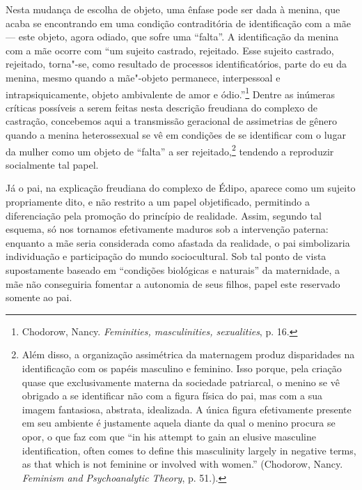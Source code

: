 Nesta mudança de escolha de objeto, uma ênfase pode ser dada à menina,
que acaba se encontrando em uma condição contraditória de identificação
com a mãe --- este objeto, agora odiado, que sofre uma ``falta''. A
identificação da menina com a mãe ocorre com ``um sujeito castrado,
rejeitado. Esse sujeito castrado, rejeitado, torna"-se, como resultado de
processos identificatórios, parte do eu da menina, mesmo quando a
mãe"-objeto permanece, interpessoal e intrapsiquicamente, objeto
ambivalente de amor e ódio.''\footnote{Chodorow, Nancy.
  \emph{Feminities, masculinities, sexualities}, p. 16.} Dentre as
inúmeras críticas possíveis a serem feitas nesta descrição freudiana do
complexo de castração, concebemos aqui a transmissão geracional de
assimetrias de gênero quando a menina heterossexual se vê em condições
de se identificar com o lugar da mulher como um objeto de ``falta'' a
ser rejeitado,\footnote{Além disso, a organização assimétrica da
  maternagem produz disparidades na identificação com os papéis
  masculino e feminino. Isso porque, pela criação quase que
  exclusivamente materna da sociedade patriarcal, o menino se vê
  obrigado a se identificar não com a figura física do pai, mas com a
  sua imagem fantasiosa, abstrata, idealizada. A única figura
  efetivamente presente em seu ambiente é justamente aquela diante da
  qual o menino procura se opor, o que faz com que ``in his attempt to
  gain an elusive masculine identification, often comes to define this
  masculinity largely in negative terms, as that which is not feminine
  or involved with women.'' (Chodorow, Nancy. \emph{Feminism and
  Psychoanalytic Theory}, p. 51.).} tendendo a reproduzir socialmente
tal papel.

Já o pai, na explicação freudiana do complexo de Édipo, aparece como um
sujeito propriamente dito, e não restrito a um papel objetificado,
permitindo a diferenciação pela promoção do princípio de realidade.
Assim, segundo tal esquema, só nos tornamos efetivamente maduros sob a
intervenção paterna: enquanto a mãe seria considerada como afastada da
realidade, o pai simbolizaria individuação e participação do mundo
sociocultural. Sob tal ponto de vista supostamente baseado em
``condições biológicas e naturais'' da maternidade, a mãe não
conseguiria fomentar a autonomia de seus filhos, papel este reservado
somente ao pai.

